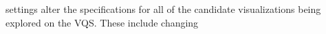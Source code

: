 
 settings alter the specifications for all of the candidate visualizations being explored on the VQS. These include changing 

